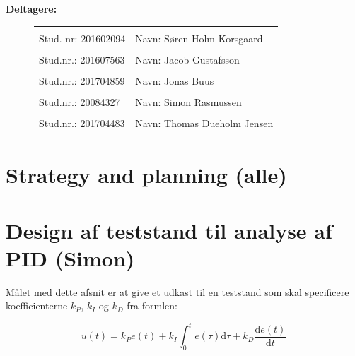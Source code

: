 \textbf{Deltagere:}
\begin{figure}[h]
  \centering
  \begin{tabular}{|p{5cm}p{10cm}|}
    \hline
    &\\
    Stud. nr: 201602094 & Navn: Søren Holm Korsgaard \\
    \hline
    &\\
    Stud.nr.: 201607563 & Navn: Jacob Gustafsson \\
    \hline
    &\\
    Stud.nr.: 201704859 & Navn: Jonas Buus \\
    \hline
    &\\
    Stud.nr.: 20084327 & Navn: Simon Rasmussen \\
    \hline
    &\\
    Stud.nr.: 201704483 & Navn: Thomas Dueholm Jensen \\
    \hline
  \end{tabular}

\end{figure}
\vspace{-5mm}
\setcounter{tocdepth}{2}
\tableofcontents
\thispagestyle{empty}
\newpage
\setcounter{page}{1}


\section{Strategy and planning (alle)}
\label{sec:strategy-planning}

\section{Design af teststand til analyse af PID (Simon)}
\label{sec:design-af-teststand}

Målet med dette afsnit er at give et udkast til en teststand som skal specificere koefficienterne $k_P$, $k_I$ og $k_D$ fra formlen:

\begin{equation}
  \label{eq:1}
  u(t)=k_Pe(t)+k_I \int_0^t e(\tau)\mathrm{d}\tau + k_D\frac{\mathrm{d}e(t)}{\mathrm{d}t}
\end{equation}

